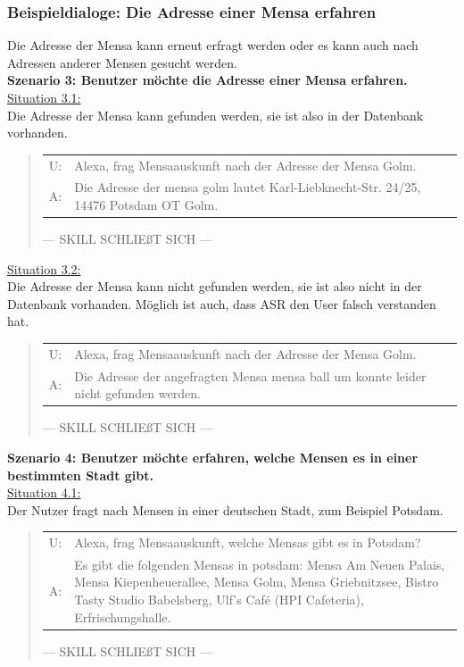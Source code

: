 \documentclass[12pt]{article}
\begin{document}
\subsubsection{Beispieldialoge: Die Adresse einer Mensa erfahren}
Die Adresse der Mensa kann erneut erfragt werden oder es kann auch nach Adressen anderer Mensen gesucht werden.\\

\newpage
\textbf{Szenario 3: Benutzer möchte die Adresse einer Mensa erfahren.}\\
\ul{Situation 3.1:}\\Die Adresse der Mensa kann gefunden werden, sie ist also in der Datenbank vorhanden.
\begin{quote}
\begin{tabular}{lp{12cm}}
  U:& Alexa, frag Mensaauskunft nach der Adresse der Mensa Golm.\\
  A:& Die Adresse der mensa golm lautet Karl-Liebknecht-Str. 24/25, 14476 Potsdam OT Golm.\\[0.2cm]
\end{tabular}
--- SKILL SCHLIEßT SICH ---\\
\end{quote}

\ul{Situation 3.2:}\\Die Adresse der Mensa kann nicht gefunden werden, sie ist also nicht in der Datenbank vorhanden. Möglich ist auch, dass ASR den User falsch verstanden hat.
\begin{quote}
\begin{tabular}{lp{12cm}}
  U:& Alexa, frag Mensaauskunft nach der Adresse der Mensa Golm.\\
  A:& Die Adresse der angefragten Mensa mensa ball um konnte leider nicht gefunden werden.\\[0.2cm] 
\end{tabular}
--- SKILL SCHLIEßT SICH ---\\
\end{quote}

\textbf{Szenario 4: Benutzer möchte erfahren, welche Mensen es in einer bestimmten Stadt gibt.}\\
\ul{Situation 4.1:}\\Der Nutzer fragt nach Mensen in einer deutschen Stadt, zum Beispiel Potsdam.
\begin{quote}
\begin{tabular}{lp{12cm}}
  U:& Alexa, frag Mensaauskunft, welche Mensas gibt es in Potsdam?\\
  A:& Es gibt die folgenden Mensas in potsdam: Mensa Am Neuen Palais, Mensa Kiepenheuerallee, Mensa Golm, Mensa Griebnitzsee, Bistro Tasty Studio Babelsberg, Ulf's Café (HPI Cafeteria), Erfrischungshalle.\\[0.2cm]
\end{tabular}
--- SKILL SCHLIEßT SICH ---\\
\end{quote}
\end{document}
